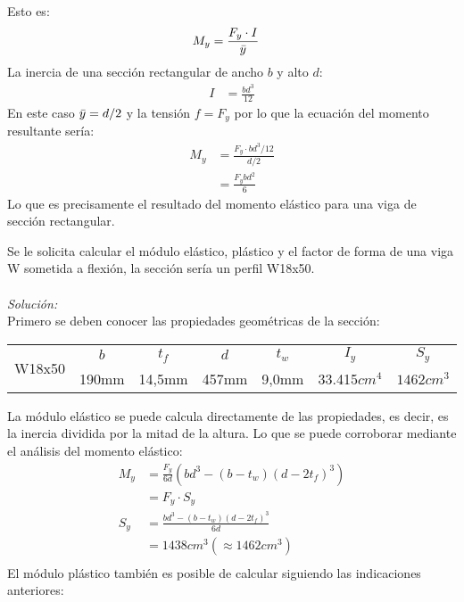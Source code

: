 Esto es:
\begin{align}
    M_y &= \frac{F_y\cdot I}{\Bar{y}}
\end{align}
La inercia de una sección rectangular de ancho $b$ y alto $d$:
\begin{align}
    I &= \frac{bd^3}{12}
\end{align}
En este caso $\Bar{y}=d/2$ y la tensión $f = F_y $ por lo que la ecuación del momento resultante sería:
\begin{align}
    M_y &= \frac{F_y\cdot bd^3/12}{d/2}\\
        &= \frac{F_ybd^2}{6}
\end{align}
Lo que es precisamente el resultado del momento elástico para una viga de sección rectangular.\\
\begin{example}
Se le solicita calcular el módulo elástico, plástico y el factor de forma de una viga W sometida a flexión, la sección sería un perfil W18x50.\\
\\
\textit{Solución:}\\
Primero se deben conocer las propiedades geométricas de la sección:\\
\begin{table}[h!]
\centering
\begin{tabular}{ccccccc}
\hline
\multirow{2}{*}{W18x50} & $b$      & $t_f$      & $d$        & $t_w$       & $I_y$     & $S_y$     \\ \cline{2-7} 
                         & 190mm & 14,5mm & 457mm & 9,0mm & 33.415$cm^4$ & $1462cm^3$ \\ \hline
\end{tabular}
\end{table}
La módulo elástico se puede calcula directamente de las propiedades, es decir, es la inercia dividida por la mitad de la altura. Lo que se puede corroborar mediante el análisis del momento elástico:
\begin{align*}
    M_y &= \frac{F_y}{6d}(bd^3-(b-t_w)(d-2t_f)^3)\\
        &= F_y\cdot S_y\\
    S_y &= \frac{bd^3-(b-t_w)(d-2t_f)^3}{6d}\\
        &=1438cm^3 (\approx 1462cm^3)\\
\end{align*}
El módulo plástico también es posible de calcular siguiendo las indicaciones anteriores:\\
\begin{align*}

\end{align*}
\end{example}
